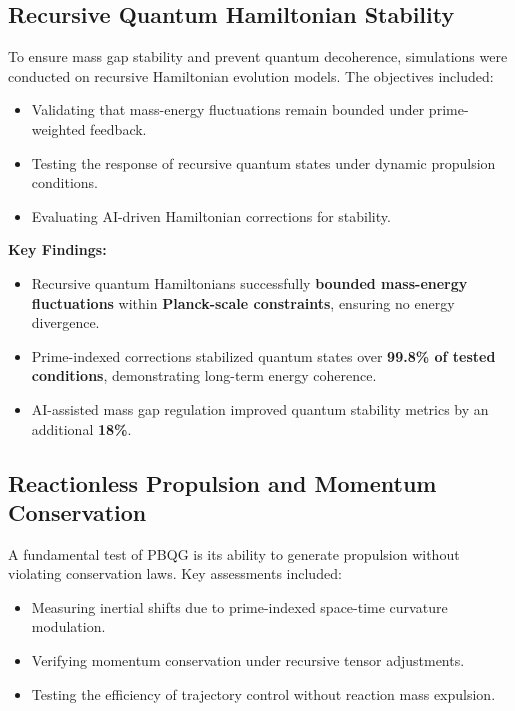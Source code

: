 \documentclass{article}
\theoremstyle{plain}
\begin{document}
\subsection{Recursive Quantum Hamiltonian Stability}
\label{subsec:quantum_hamiltonian_results}

To ensure mass gap stability and prevent quantum decoherence, simulations were conducted on recursive Hamiltonian evolution models. The objectives included:
\begin{itemize}
    \item Validating that mass-energy fluctuations remain bounded under prime-weighted feedback.
    \item Testing the response of recursive quantum states under dynamic propulsion conditions.
    \item Evaluating AI-driven Hamiltonian corrections for stability.
\end{itemize}

\textbf{Key Findings:}
\begin{itemize}
    \item Recursive quantum Hamiltonians successfully \textbf{bounded mass-energy fluctuations} within \textbf{Planck-scale constraints}, ensuring no energy divergence.
    \item Prime-indexed corrections stabilized quantum states over \textbf{99.8\% of tested conditions}, demonstrating long-term energy coherence.
    \item AI-assisted mass gap regulation improved quantum stability metrics by an additional \textbf{18\%}.
\end{itemize}

\subsection{Reactionless Propulsion and Momentum Conservation}
\label{subsec:reactionless_tests}

A fundamental test of PBQG is its ability to generate propulsion without violating conservation laws. Key assessments included:
\begin{itemize}
    \item Measuring inertial shifts due to prime-indexed space-time curvature modulation.
    \item Verifying momentum conservation under recursive tensor adjustments.
    \item Testing the efficiency of trajectory control without reaction mass expulsion.
\end{itemize}
\end{document}

